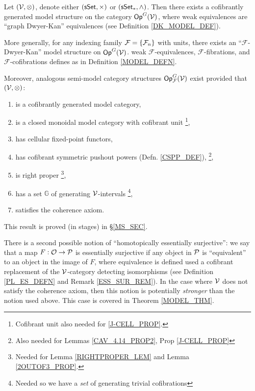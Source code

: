 \documentclass[a4paper,10pt
,draft
]{article}%
\renewcommand{\F}{\mathcal F}
\renewcommand{\1}{\eta}%
\begin{document}
\begin{theorem}
      \label{INTRO_MODEL_THM}
      Let $(\V, \otimes)$, denote either $(\sSet, \times)$ or $(\sSet_{\**}, \wedge)$.
      Then there exists a cofibrantly generated model structure on the category $\Op^G(\V)$,
      where weak equivalences are ``graph Dwyer-Kan'' equivalences (see Definition \ref{DK_MODEL_DEF}). 

      More generally, for any indexing family $\F = \set{\F_n}$ with units,
      there exists an ``$\F$-Dwyer-Kan'' model structure on $\Op^G(\V)$.
      weak $\F$-equivalences, $\F$-fibrations, and $\F$-cofibrations defines as in Definition \ref{MODEL_DEFN}.
           
      Moreover, analogous semi-model category structures $\Op^G_\F(\V)$ exist
      provided that $(\V, \otimes)$:
      \begin{enumerate}[label = (\roman*)]\itemsep-4pt
      \item is a cofibrantly generated model category,
      \item is a closed monoidal model category with cofibrant unit
            \footnote{Cofibrant unit also needed for \ref{J-CELL_PROP}.},
      \item has cellular fixed-point functors,
      \item \label{I_CSPP_LBL} has cofibrant symmetric pushout powers  (Defn. \ref{CSPP_DEF}),
            \footnote{Also needed for Lemmas \ref{CAV_4.14_PROP2}, Prop \ref{J-CELL_PROP}}, %
      \item \label{I_RP_LBL} is right proper
            \footnote{Needed for Lemma \ref{RIGHTPROPER_LEM} and Lemma \ref{2OUTOF3_PROP}.},
      \item \label{I_GENSET_LBL} has a set $\mathbb{G}$ of generating $\V$-intervals
            \footnote{Needed so we have a \textit{set} of generating trivial cofibrations},
      \item satisfies the coherence axiom.
      \end{enumerate}
\end{theorem}

This result is proved (in stages) in \S \ref{MS_SEC}.

There is a second possible notion of ``homotopically essentially surjective'':
we say that a map $F: \O \to \P$ is essentially surjective if any object in $\P$ is ``equivalent'' to an object in the image of $F$,
where equivalence is defined used a cofibrant replacement of the $\V$-category detecting isomorphisms (see Definition \ref{PL_ES_DEFN} and Remark \ref{ESS_SUR_REM}).
In the case where $\V$ does not satisfy the coherence axiom, then this notion is potentially \textit{stronger} than the notion used above.
This case is covered in Theorem \ref{MODEL_THM}.
\end{document}
